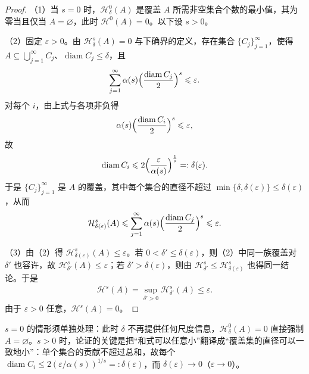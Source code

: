 \documentclass[../../main.tex]{subfiles}%
\begin{document}
\begin{proof}
（1）当 $s=0$ 时，$\mathcal{H}^0_\delta(A)$ 是覆盖 $A$ 所需非空集合个数的最小值，其为零当且仅当 $A=\varnothing$，此时 $\mathcal{H}^0(A)=0$。以下设 $s>0$。

（2）固定 $\varepsilon>0$。由 $\mathcal{H}^s_\delta(A)=0$ 与下确界的定义，存在集合 $\{C_j\}_{j=1}^{\infty}$，使得 $A\subseteq\bigcup_{j=1}^{\infty}C_j$、$\operatorname{diam}C_j\leqslant\delta$，且
\begin{align*}
\sum_{j=1}^{\infty}\alpha(s)\Bigl(\frac{\operatorname{diam}C_j}{2}\Bigr)^s\leqslant\varepsilon.
\end{align*}
对每个 $i$，由上式与各项非负得
\begin{align*}
\alpha(s)\Bigl(\frac{\operatorname{diam}C_i}{2}\Bigr)^s\leqslant\varepsilon,
\end{align*}
故
\begin{align*}
\operatorname{diam}C_i\leqslant2\Bigl(\frac{\varepsilon}{\alpha(s)}\Bigr)^{\frac1s}=:\delta(\varepsilon).
\end{align*}
于是 $\{C_j\}_{j=1}^{\infty}$ 是 $A$ 的覆盖，其中每个集合的直径不超过 $\min\{\delta,\delta(\varepsilon)\}\leqslant\delta(\varepsilon)$，从而
\begin{align*}
\mathcal{H}^s_{\delta(\varepsilon)}(A)\leqslant\sum_{j=1}^{\infty}\alpha(s)\Bigl(\frac{\operatorname{diam}C_j}{2}\Bigr)^s\leqslant\varepsilon.
\end{align*}

（3）由（2）得 $\mathcal{H}^s_{\delta(\varepsilon)}(A)\leqslant\varepsilon$。若 $0<\delta'\leqslant\delta(\varepsilon)$，则（2）中同一族覆盖对 $\delta'$ 也容许，故 $\mathcal{H}^s_{\delta'}(A)\leqslant\varepsilon$；若 $\delta'>\delta(\varepsilon)$，则由 $\mathcal{H}^s_{\delta'}\leqslant\mathcal{H}^s_{\delta(\varepsilon)}$ 也得同一结论。于是
\begin{align*}
\mathcal{H}^s(A)=\sup_{\delta'>0}\mathcal{H}^s_{\delta'}(A)\leqslant\varepsilon.
\end{align*}
由于 $\varepsilon>0$ 任意，$\mathcal{H}^s(A)=0$。
\end{proof}

\begin{remark}\label{remark:ch02-lem-2-1-补证说明}
$s=0$ 的情形须单独处理：此时 $\delta$ 不再提供任何尺度信息，$\mathcal{H}^0_\delta(A)=0$ 直接强制 $A=\varnothing$。$s>0$ 时，论证的关键是把“和式可以任意小”翻译成“覆盖集的直径可以一致地小”：单个集合的贡献不超过总和，故每个 $\operatorname{diam}C_i\leqslant2(\varepsilon/\alpha(s))^{1/s}=:\delta(\varepsilon)$，而 $\delta(\varepsilon)\to0$（$\varepsilon\to0$）。
\end{remark}
\end{document}

